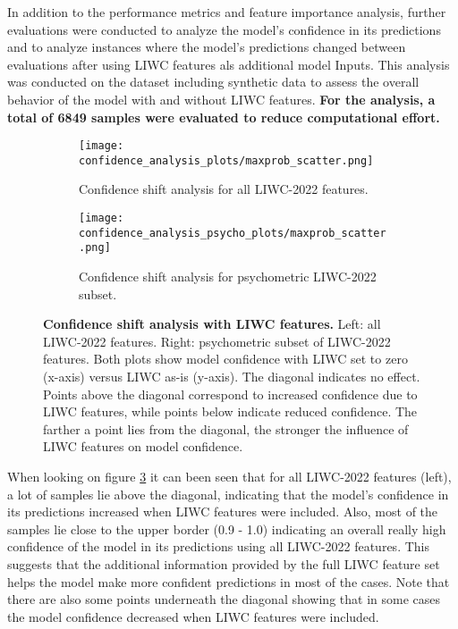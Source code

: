 In addition to the performance metrics and feature importance analysis, further evaluations were conducted to analyze the model's confidence in its predictions and to analyze instances where the model's predictions changed between evaluations after using LIWC features als additional model Inputs. This analysis was conducted on the dataset including synthetic data to assess the overall behavior of the model with and without LIWC features. \textbf{For the analysis, a total of 6849 samples were evaluated to reduce computational effort.}

\begin{figure}[H]
  \centering
  
  \begin{subfigure}[t]{0.49\textwidth}
    \centering
    \texttt{[image: confidence\_analysis\_plots/maxprob\_scatter.png]}
    \caption{Confidence shift analysis for all LIWC-2022 features.}
    \label{fig:confshift_all}
  \end{subfigure}\hfill
  \begin{subfigure}[t]{0.49\textwidth}
    \centering
    \texttt{[image: confidence\_analysis\_psycho\_plots/maxprob\_scatter.png]}
    \caption{Confidence shift analysis for psychometric LIWC-2022 subset.}
    \label{fig:confshift_psycho}
  \end{subfigure}

  \caption[Confidence shift analysis with LIWC features.]{\textbf{Confidence shift analysis with LIWC features.} 
  Left: all LIWC-2022 features. Right: psychometric subset of LIWC-2022 features. 
  Both plots show model confidence with LIWC set to zero (x-axis) versus LIWC as-is (y-axis). 
  The diagonal indicates no effect. 
  Points above the diagonal correspond to increased confidence due to LIWC features, while points below indicate reduced confidence. 
  The farther a point lies from the diagonal, the stronger the influence of LIWC features on model confidence. }
  \label{fig:confidence_shift}

\end{figure}


When looking on figure \ref{fig:confidence_shift} it can been seen that for all LIWC-2022 features (left), a lot of samples lie above the diagonal, indicating that the model's confidence in its predictions increased when LIWC features were included. Also, most of the samples lie close to the upper border (0.9 - 1.0) indicating an overall really high confidence of the model in its predictions using all LIWC-2022 features.
This suggests that the additional information provided by the full LIWC feature set helps the model make more confident predictions in most of the cases. Note that there are also some points underneath the diagonal showing that in some cases the model confidence decreased when LIWC features were included. 

